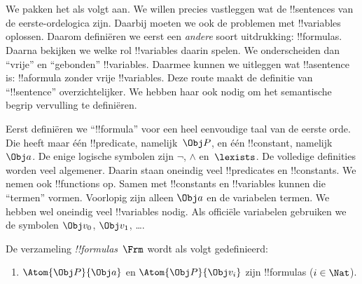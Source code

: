 \documentclass[openany]{memoir}
\begin{document}
\begingroup
\def\olfilename{OLP-0142}
\def\olfilepath{content/first-order-logic/introduction/}
\hypertarget{unit-OLP-0142}{}




\section{}

We pakken het als volgt aan. We willen precies vastleggen wat de
!!{sentence}s van de eerste-ordelogica zijn. Daarbij moeten we ook de
problemen met !!{variable}s oplossen. Daarom definiëren we eerst een
\emph{andere} soort uitdrukking: !!{formula}s. Daarna bekijken we welke
rol !!{variable}s daarin spelen. We onderscheiden dan ``vrije'' en
``gebonden'' !!{variable}s. Daarmee kunnen we uitleggen wat
!!a{sentence} is: !!a{formula} zonder vrije !!{variable}s. Deze route
maakt de definitie van ``!!{sentence}'' overzichtelijker. We hebben
haar ook nodig om het semantische begrip vervulling te definiëren.

Eerst definiëren we ``!!{formula}'' voor een heel eenvoudige taal van
de eerste orde. Die heeft maar één !!{predicate}, namelijk~$\Obj P$,
en één !!{constant}, namelijk~$\Obj a$. De enige logische symbolen zijn
$\lnot$, $\land$ en~$\lexists$. De volledige definities worden veel
algemener. Daarin staan oneindig veel !!{predicate}s en
!!{constant}s. We nemen ook !!{function}s op. Samen met !!{constant}s
en !!{variable}s kunnen die ``termen'' vormen. Voorlopig zijn alleen
$\Obj a$ en de variabelen termen. We hebben wel oneindig veel
!!{variable}s nodig. Als officiële variabelen gebruiken we de symbolen
$\Obj v_0$, $\Obj v_1$, \dots.

\begin{defn}
De verzameling \emph{!!{formula}s}~$\Frm$ wordt als volgt gedefinieerd:
\begin{enumerate}
\item{} $\Atom{\Obj P}{\Obj a}$ en $\Atom{\Obj
  P}{\Obj v_i}$ zijn !!{formula}s ($i \in \Nat$).




\end{enumerate}
\end{defn}
\end{document}
